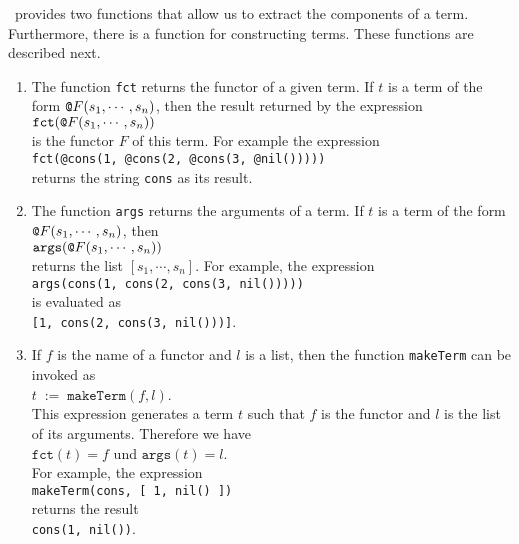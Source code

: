 \setlx\ provides two functions that allow us to extract the components of a term.  Furthermore, there is a
function for constructing terms.  These functions are described next.
\begin{enumerate}
\item The function \texttt{fct} returns the functor of a given term.
      If  $t$ is a term of the form $\at F(s_1,\cdots,s_n)$, then the result returned by the expression
      \\[0.2cm]
      \hspace*{1.3cm}
      $\texttt{fct}(\at F(s_1,\cdots,s_n))$
      \\[0.2cm]
      is the functor $F$ of this term.  For example the expression
      \\[0.2cm]
      \hspace*{1.3cm}
      \texttt{fct(@cons(1, @cons(2, @cons(3, @nil()))))}
      \\[0.2cm]
      returns the string  \texttt{cons} as its result.
\item The function \texttt{args} returns the arguments of a term.
      If  $t$ is a term of the form $\at F(s_1,\cdots,s_n)$, then
      \\[0.2cm]
      \hspace*{1.3cm}
      $\mathtt{args}(\at F(s_1,\cdots,s_n))$
      \\[0.2cm]
      returns the list $[s_1, \cdots, s_n]$. For example, the expression
      \\[0.2cm]
      \hspace*{1.3cm}
      \texttt{args(\at cons(1, \at cons(2, \at cons(3, \at nil()))))}
      \\[0.2cm]
      is evaluated as
      \\[0.2cm]
      \hspace*{1.3cm}
      \texttt{[1, \at cons(2, \at cons(3, \at nil()))]}.
\item If $f$ is the name of a functor and  $l$ is a list, then the function \texttt{makeTerm} can be invoked as
      \\[0.2cm]
      \hspace*{1.3cm}
      $t \;\mathtt{:=}\; \texttt{makeTerm}(f,l)$.
      \\[0.2cm]
      This expression generates a term $t$ such that $f$ is the functor and $l$ is the list of its
      arguments.  Therefore we have
      \\[0.2cm]
      \hspace*{1.3cm}
      $\mathtt{fct}(t) = f$  \quad und \quad $\mathtt{args}(t) = l$.
      \\[0.2cm]
      For example, the expression
      \\[0.2cm]
      \hspace*{1.3cm}
      \texttt{makeTerm(cons, [ 1, \at nil() ])}
      \\[0.2cm]
      returns the result
      \\[0.2cm]
      \hspace*{1.3cm}
      \texttt{\at cons(1, \at nil())}.
\end{enumerate}

